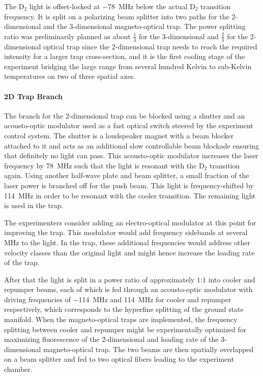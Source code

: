The D$_2$ light is offset-locked at \SI{-78}{\mega\hertz} below the actual D$_2$ transition frequency. It is split on a polarizing beam splitter into two paths for the 2-dimensional and the 3-dimensional magneto-optical trap. The power splitting ratio was preliminarily planned as about $\frac{1}{3}$ for the 3-dimensional and $\frac{2}{3}$ for the 2-dimensional optical trap since the 2-dimensional trap needs to reach the required intensity for a larger trap cross-section, and it is the first cooling stage of the experiment bridging the large range from several hundred Kelvin to sub-Kelvin temperatures on two of three spatial axes.

\paragraph{2D Trap Branch} The branch for the 2-dimensional trap can be blocked using a shutter and an acousto-optic modulator used as a fast optical switch steered by the experiment control system. The shutter is a loudspeaker magnet with a beam blocker attached to it and acts as an additional slow controllable beam blockade ensuring that definitely no light can pass. This acousto-optic modulator increases the laser frequency by \SI{+78}{\mega\hertz} such that the light is resonant with the D$_2$ transition again. Using another half-wave plate and beam splitter, a small fraction of the laser power is branched off for the push beam. This light is frequency-shifted by \SI{+114}{\mega\hertz} in order to be resonant with the cooler transition. The remaining light is used in the trap.

The experimenters consider adding an electro-optical modulator at this point for improving the trap. This modulator would add frequency sidebands at several \si{\mega\hertz} to the light. In the trap, these additional frequencies would address other velocity classes than the original light and might hence increase the loading rate of the trap.

After that the light is split in a power ratio of approximately $1$:$1$ into cooler and repumper beams, each of which is fed through an acousto-optic modulator with driving frequencies of \SI{-114}{\mega\hertz} and \SI{+114}{\mega\hertz} for cooler and repumper respectively, which corresponds to the hyperfine splitting of the ground state manifold. When the magneto-optical traps are implemented, the frequency splitting between cooler and repumper might be experimentally optimized for maximizing fluorescence of the 2-dimensional and loading rate of the 3-dimensional magneto-optical trap. The two beams are then spatially overlapped on a beam splitter and fed to two optical fibers leading to the experiment chamber.

